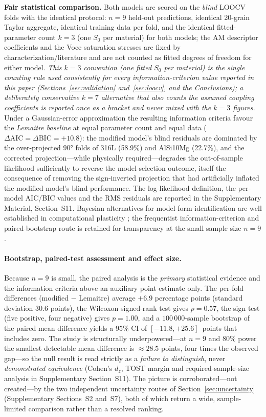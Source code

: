 \textbf{Fair statistical comparison.} Both models are scored on the \emph{blind} LOOCV folds with the identical protocol: $n = 9$ held-out predictions, identical 20-grain Taylor aggregate, identical training data per fold, and the identical fitted-parameter count $k = 3$ (one $S_0$ per material) for both models; the AM descriptor coefficients and the Voce saturation stresses are fixed by characterization/literature and are not counted as fitted degrees of freedom for either model. \emph{This $k=3$ convention (one fitted $S_0$ per material) is the single counting rule used consistently for every information-criterion value reported in this paper (Sections~\ref{sec:validation} and~\ref{sec:loocv}, and the Conclusions); a deliberately conservative $k=7$ alternative that also counts the assumed coupling coefficients is reported once as a bracket and never mixed with the $k=3$ figures.} Under a Gaussian-error approximation the resulting information criteria favour the \emph{Lemaitre baseline} at equal parameter count and equal data ($\Delta\mathrm{AIC} = \Delta\mathrm{BIC} = +10.8$): the modified model's blind residuals are dominated by the over-projected $\ang{90}$ folds of 316L (58.9\%) and AlSi10Mg (22.7\%), and the corrected projection---while physically required---degrades the out-of-sample likelihood sufficiently to reverse the model-selection outcome, itself the consequence of removing the sign-inverted projection that had artificially inflated the modified model's blind performance. The log-likelihood definition, the per-model AIC/BIC values and the RMS residuals are reported in the Supplementary Material, Section~S11. Bayesian alternatives for model-form identification are well established in computational plasticity \cite{venkatraman2025bayes}; the frequentist information-criterion and paired-bootstrap route is retained for transparency at the small sample size $n=9$.

\paragraph{Bootstrap, paired-test assessment and effect size.} Because $n = 9$ is small, the paired analysis is the \emph{primary} statistical evidence and the information criteria above an auxiliary point estimate only. The per-fold differences (modified $-$ Lemaitre) average $+6.9$ percentage points (standard deviation $30.6$ points), the Wilcoxon signed-rank test gives $p = 0.57$, the sign test (five positive, four negative) gives $p = 1.00$, and a $100\,000$-sample bootstrap of the paired mean difference yields a $95\%$ CI of $[-11.8,+25.6]$~points that includes zero. The study is structurally underpowered---at $n=9$ and $80\%$ power the smallest detectable mean difference is $\approx 28.5$ points, four times the observed gap---so the null result is read strictly as a \emph{failure to distinguish}, never \emph{demonstrated equivalence} (Cohen's $d_z$, TOST margin and required-sample-size analysis in Supplementary Section~S11). The picture is corroborated---not created---by the two independent uncertainty routes of Section~\ref{sec:uncertainty} (Supplementary Sections~S2 and~S7), both of which return a wide, sample-limited comparison rather than a resolved ranking.

